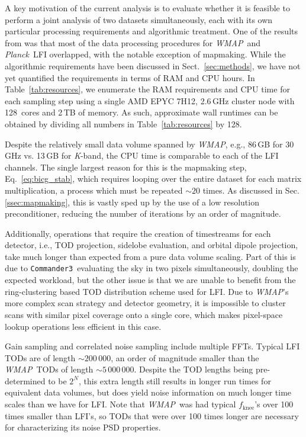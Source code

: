 \documentclass[twocolumn]{../../common/aa}
\def\WMAP{\emph{WMAP}}
\def\Planck{\emph{Planck}}
\def\commanderthree{\texttt{Commander3}}
\newcommand{\K}[0]{\textit K}
\begin{document}
A key motivation of the current analysis is to evaluate whether it is feasible to perform a joint analysis of two datasets simultaneously, each with its own particular processing requirements and algorithmic treatment. One of the results from \citet{bp17} was that most of the data processing procedures for  \WMAP\ and \Planck\ LFI overlapped, with the notable exception of mapmaking. While the algorithmic requirements have been discussed in Sect.~\ref{sec:methods}, we have not yet quantified the requirements in terms of RAM and CPU hours. In Table~\ref{tab:resources}, we enumerate the RAM requirements and CPU time for each sampling step using a single AMD EPYC 7H12, 2.6\,GHz cluster node with 128~cores and 2\,TB of memory. As such, approximate wall runtimes can be obtained by dividing all numbers in Table~\ref{tab:resources} by 128.

Despite the relatively small data volume spanned by \WMAP, e.g., 86\,GB for 30\,GHz vs. 13\,GB for \K-band, the CPU time is comparable to each of the LFI channels.  The single largest reason for this is the mapmaking step, Eq.~\eqref{eq:bicg_stab}, which requires looping over the entire dataset for each matrix multiplication, a process which must be repeated $\sim20$ times. As discussed in Sec. \ref{ssec:mapmaking}, this is vastly sped up by the use of a low resolution preconditioner, reducing the number of iterations by an order of magnitude.


Additionally, operations that require the creation of  timestreams for each detector, i.e., TOD projection, sidelobe evaluation, and orbital dipole projection, take much longer than expected from a pure data volume scaling. Part of this is due to \commanderthree\ evaluating the sky in two pixels simultaneously, doubling the expected workload, but the other issue is that we are unable to benefit from the ring-clustering based TOD distribution scheme used for LFI. Due to \WMAP's more complex scan strategy and detector geometry, it is impossible to cluster scans with similar pixel coverage onto a single core, which makes pixel-space lookup operations less efficient in this case.

Gain sampling and correlated noise sampling include multiple FFTs. Typical LFI TODs are of length $\sim200\,000$, an order of magnitude smaller than the \WMAP\ TODs of length $\sim5\,000\,000$. Despite the TOD lengths being pre-determined to be $2^N$, this extra length still results in longer run times for equivalent data volumes, but does yield noise information on much longer time scales than we have for LFI. Note that \WMAP\ was had typical $f_\mathrm{knee}$'s over 100 times smaller than LFI's, so TODs that were over 100 times longer are necessary for characterizing its noise PSD properties.
\end{document}
